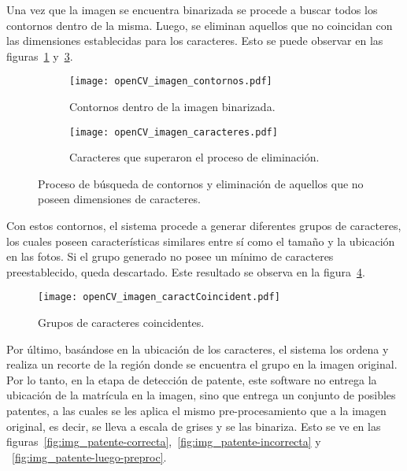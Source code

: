 Una vez que la imagen se encuentra binarizada se procede a buscar todos los contornos dentro de la misma. Luego, se eliminan aquellos que no coincidan con las dimensiones establecidas para los caracteres. Esto se puede observar en las figuras~\ref{fig:img_cont_opencv} y~\ref{fig:img_caract_opencv}.

\begin{figure}[H]
	\centering
	\begin{subfigure}[b]{0.49\textwidth}
		\texttt{[image: openCV\_imagen\_contornos.pdf]}
		\caption{Contornos dentro de la imagen binarizada.}
		\label{fig:img_cont_opencv}
	\end{subfigure}
	\hfill
	\begin{subfigure}[b]{0.49\textwidth}
		\texttt{[image: openCV\_imagen\_caracteres.pdf]}
		\caption{Caracteres que superaron el proceso de eliminación.}
		\label{fig:img_caract_opencv}
	\end{subfigure}
	\caption{Proceso de búsqueda de contornos y eliminación de aquellos que no poseen dimensiones de caracteres.}
\end{figure}

Con estos contornos, el sistema procede a generar diferentes grupos de caracteres, los cuales poseen características similares entre sí como el tamaño y la ubicación en las fotos. Si el grupo generado no posee un mínimo de caracteres preestablecido, queda descartado. Este resultado se observa en la figura~\ref{fig:img_caract_coinc_opencv}.

\begin{figure}[H]
	\centering
	\texttt{[image: openCV\_imagen\_caractCoincident.pdf]}
	\caption{Grupos de caracteres coincidentes.}
	\label{fig:img_caract_coinc_opencv}
\end{figure}

Por último, basándose en la ubicación de los caracteres, el sistema los ordena y realiza un recorte de la región donde se encuentra el grupo en la imagen original. Por lo tanto, en la etapa de detección de patente, este software no entrega la ubicación de la matrícula en la imagen, sino que entrega un conjunto de posibles patentes, a las cuales se les aplica el mismo pre-procesamiento que a la imagen original, es decir, se lleva a escala de grises y se las binariza. Esto se ve en las figuras~\ref{fig:img_patente-correcta},~\ref{fig:img_patente-incorrecta} y ~\ref{fig:img_patente-luego-preproc}.

